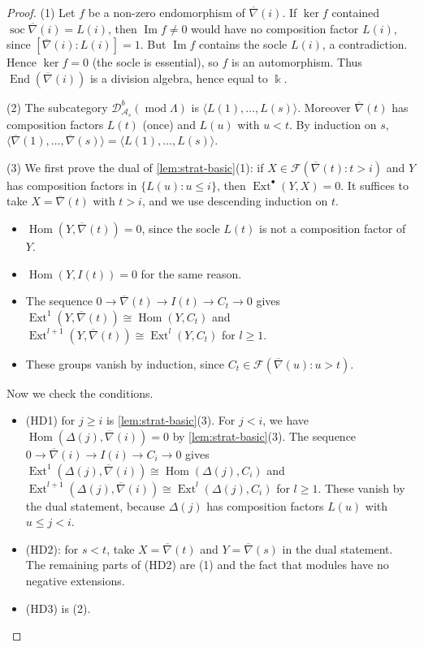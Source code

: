 \documentclass[11pt,reqno]{amsart}
\theoremstyle{plain}
\theoremstyle{definition}
\theoremstyle{remark}
\newcommand{\kk}{\Bbbk}
\DeclareMathOperator{\Hom}{Hom}
\DeclareMathOperator{\End}{End}
\DeclareMathOperator{\Ext}{Ext}
\DeclareMathOperator{\soc}{soc}
\DeclareMathOperator{\im}{Im}
\newcommand{\modd}{\operatorname{mod}}
\newcommand{\Db}{\mathcal{D}^b}
\newcommand{\thick}[1]{\langle #1\rangle}
\newcommand{\nablabar}{\overline{\nabla}}
\newcommand{\cA}{\mathcal{A}}
\newcommand{\cF}{\mathcal{F}}
\begin{document}
\begin{proof}
(1) Let $f$ be a non-zero endomorphism of $\nablabar(i)$. If $\ker f$ contained $\soc\nablabar(i)=L(i)$, then $\im f\ne0$ would have no composition factor $L(i)$, since $[\nablabar(i):L(i)]=1$. But $\im f$ contains the socle $L(i)$, a contradiction. Hence $\ker f=0$ (the socle is essential), so $f$ is an automorphism. Thus $\End(\nablabar(i))$ is a division algebra, hence equal to $\kk$.

(2) The subcategory $\Db_{\cA_s}(\modd\Lambda)$ is $\thick{L(1),\dots,L(s)}$. Moreover $\nablabar(t)$ has composition factors $L(t)$ (once) and $L(u)$ with $u<t$. By induction on $s$, $\thick{\nablabar(1),\dots,\nablabar(s)}=\thick{L(1),\dots,L(s)}$.

(3) We first prove the dual of \cref{lem:strat-basic}(1): if $X\in\cF(\nablabar(t):t>i)$ and $Y$ has composition factors in $\{L(u):u\le i\}$, then $\Ext^\bullet(Y,X)=0$. It suffices to take $X=\nablabar(t)$ with $t>i$, and we use descending induction on $t$.
\begin{itemize}
\item $\Hom(Y,\nablabar(t))=0$, since the socle $L(t)$ is not a composition factor of $Y$.
\item $\Hom(Y,I(t))=0$ for the same reason.
\item The sequence $0\to\nablabar(t)\to I(t)\to C_t\to0$ gives $\Ext^1(Y,\nablabar(t))\cong\Hom(Y,C_t)$ and $\Ext^{l+1}(Y,\nablabar(t))\cong\Ext^l(Y,C_t)$ for $l\ge1$.
\item These groups vanish by induction, since $C_t\in\cF(\nablabar(u):u>t)$.
\end{itemize}
Now we check the conditions.
\begin{itemize}
\item (HD1) for $j\ge i$ is \cref{lem:strat-basic}(3). For $j<i$, we have $\Hom(\Delta(j),\nablabar(i))=0$ by \cref{lem:strat-basic}(3). The sequence $0\to\nablabar(i)\to I(i)\to C_i\to0$ gives $\Ext^1(\Delta(j),\nablabar(i))\cong\Hom(\Delta(j),C_i)$ and $\Ext^{l+1}(\Delta(j),\nablabar(i))\cong\Ext^l(\Delta(j),C_i)$ for $l\ge1$. These vanish by the dual statement, because $\Delta(j)$ has composition factors $L(u)$ with $u\le j<i$.
\item (HD2): for $s<t$, take $X=\nablabar(t)$ and $Y=\nablabar(s)$ in the dual statement. The remaining parts of (HD2) are (1) and the fact that modules have no negative extensions.
\item (HD3) is (2). \qedhere
\end{itemize}
\end{proof}
\end{document}
